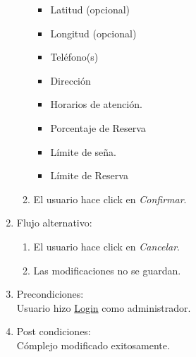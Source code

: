 \documentclass[a4paper,11pt]{article}
\begin{document}
\begin{enumerate}
\begin{enumerate}
\begin{itemize}
				 \item Latitud (opcional)
				 \item Longitud (opcional)
				 \item Tel\'efono(s)
				 \item Direcci\'on
				 \item Horarios de atenci\'on.
				 \item Porcentaje de Reserva
				 \item L\'imite de se\~na.
				 \item L\'imite de Reserva
			\end{itemize}
                        \item El usuario hace click en \emph{Confirmar}.
                \end{enumerate}
	\item Flujo alternativo:
		\begin{enumerate}
		 \item El usuario hace click en \emph{Cancelar}.
		 \item Las modificaciones no se guardan.
		\end{enumerate}

    \item Precondiciones: \\
        Usuario hizo \underline{Login} como administrador.

    \item Post condiciones: \\
        C\'omplejo modificado exitosamente.

\end{enumerate}

\end{document}
